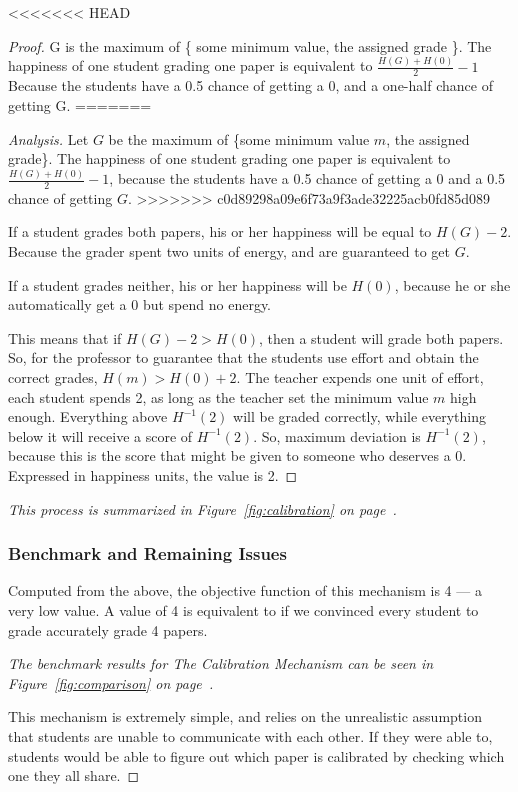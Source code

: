 \documentclass[12pt, Arial]{article}
\begin{document}
<<<<<<< HEAD
\begin{proof}
G is the maximum of \{ some minimum value, the assigned grade \}.
The happiness of one student grading one paper is equivalent to $\frac{H(G)+H(0)}{2}-1$ Because the students have a 0.5 chance of getting a 0, and a one-half chance of getting G.
=======
\begin{proof}[Analysis]
Let $G$ be the maximum of \{some minimum value $m$, the assigned grade\}.
The happiness of one student grading one paper is equivalent to $\frac{H(G)+H(0)}{2}-1$, because the students have a 0.5 chance of getting a 0 and a 0.5 chance of getting $G$.
>>>>>>> c0d89298a09e6f73a9f3ade32225acb0fd85d089

If a student grades both papers, his or her happiness will be equal to $H(G)-2$. Because the grader spent two units of energy, and are guaranteed to get $G$.

If a student grades neither, his or her happiness will be $H(0)$, because he or she automatically get a 0 but spend no energy.

This means that if $H(G) - 2 > H(0)$, then a student will grade both papers. So, for the professor to guarantee that the students use effort and obtain the correct grades, $H(m) > H(0) + 2$.
The teacher expends one unit of effort, each student spends 2, as long as the teacher set the minimum value $m$ high enough.
Everything above $H^{-1}(2)$ will be graded correctly, while everything below it will receive a score of $H^{-1}(2)$.
So, maximum deviation is $H^{-1}(2)$, because this is the score that might be given to someone who deserves a 0. Expressed in happiness units, the value is 2.
\end{proof}
\emph{This process is summarized in Figure~\ref{fig:calibration} on page~\pageref{fig:calibration}.}

\subsubsection{Benchmark and Remaining Issues}
Computed from the above, the objective function of this mechanism is 4 --- a very low value. A value of 4 is equivalent to if we convinced every student to grade accurately grade 4 papers.

\emph{The benchmark results for The Calibration Mechanism can be seen in Figure~\ref{fig:comparison} on page~\pageref{fig:comparison}.}

This mechanism is extremely simple, and relies on the unrealistic assumption that students are unable to communicate with each other. If they were able to, students would be able to figure out which paper is calibrated by checking which one they all share.


\end{proof}
\end{document}
